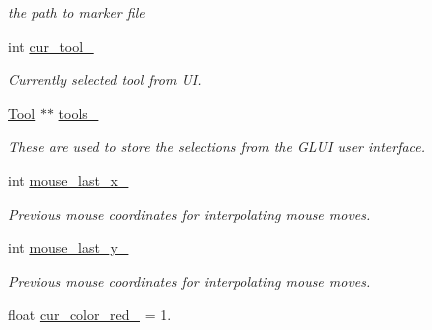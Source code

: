\begin{DoxyCompactItemize}
\begin{DoxyCompactList}\small\item\em the path to marker file \end{DoxyCompactList}\item 
int \hyperlink{classimage__tools_1_1MIAApp_a5f86ffd9e81a59a12ff54bb7641addda}{cur\+\_\+tool\+\_\+}\hypertarget{classimage__tools_1_1MIAApp_a5f86ffd9e81a59a12ff54bb7641addda}{}\label{classimage__tools_1_1MIAApp_a5f86ffd9e81a59a12ff54bb7641addda}

\begin{DoxyCompactList}\small\item\em Currently selected tool from UI. \end{DoxyCompactList}\item 
\hyperlink{classimage__tools_1_1Tool}{Tool} $\ast$$\ast$ \hyperlink{classimage__tools_1_1MIAApp_a31085c967b25f06fbfdcd775b7932cdf}{tools\+\_\+}\hypertarget{classimage__tools_1_1MIAApp_a31085c967b25f06fbfdcd775b7932cdf}{}\label{classimage__tools_1_1MIAApp_a31085c967b25f06fbfdcd775b7932cdf}

\begin{DoxyCompactList}\small\item\em These are used to store the selections from the G\+L\+UI user interface. \end{DoxyCompactList}\item 
int \hyperlink{classimage__tools_1_1MIAApp_ac7e6ec4d27cc372cfb39f4f557d2426d}{mouse\+\_\+last\+\_\+x\+\_\+}\hypertarget{classimage__tools_1_1MIAApp_ac7e6ec4d27cc372cfb39f4f557d2426d}{}\label{classimage__tools_1_1MIAApp_ac7e6ec4d27cc372cfb39f4f557d2426d}

\begin{DoxyCompactList}\small\item\em Previous mouse coordinates for interpolating mouse moves. \end{DoxyCompactList}\item 
int \hyperlink{classimage__tools_1_1MIAApp_a11890db1739569d14da6172745ec38a0}{mouse\+\_\+last\+\_\+y\+\_\+}\hypertarget{classimage__tools_1_1MIAApp_a11890db1739569d14da6172745ec38a0}{}\label{classimage__tools_1_1MIAApp_a11890db1739569d14da6172745ec38a0}

\begin{DoxyCompactList}\small\item\em Previous mouse coordinates for interpolating mouse moves. \end{DoxyCompactList}\item 
float \hyperlink{classimage__tools_1_1MIAApp_adbcfa493342146f54d6971c2cc1d0e2b}{cur\+\_\+color\+\_\+red\+\_\+} = 1.\hypertarget{classimage__tools_1_1MIAApp_adbcfa493342146f54d6971c2cc1d0e2b}{}\label{classimage__tools_1_1MIAApp_adbcfa493342146f54d6971c2cc1d0e2b}


\end{DoxyCompactItemize}
